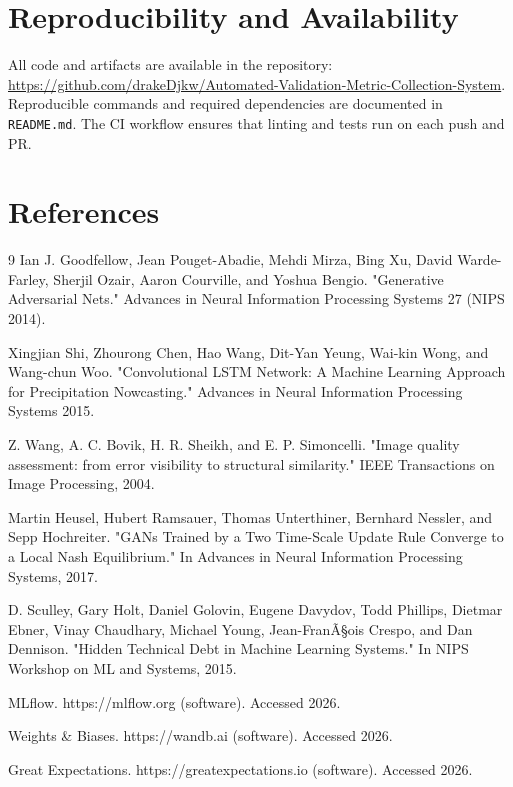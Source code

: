 \documentclass[11pt]{article}
\begin{document}
\section{Reproducibility and Availability}
All code and artifacts are available in the repository: \url{https://github.com/drakeDjkw/Automated-Validation-Metric-Collection-System}. Reproducible commands and required dependencies are documented in \texttt{README.md}. The CI workflow ensures that linting and tests run on each push and PR.

\section{References}
\begin{thebibliography}{9}
Ian J. Goodfellow, Jean Pouget-Abadie, Mehdi Mirza, Bing Xu, David Warde-Farley, Sherjil Ozair, Aaron Courville, and Yoshua Bengio. "Generative Adversarial Nets." Advances in Neural Information Processing Systems 27 (NIPS 2014).

Xingjian Shi, Zhourong Chen, Hao Wang, Dit-Yan Yeung, Wai-kin Wong, and Wang-chun Woo. "Convolutional LSTM Network: A Machine Learning Approach for Precipitation Nowcasting." Advances in Neural Information Processing Systems 2015.

Z. Wang, A. C. Bovik, H. R. Sheikh, and E. P. Simoncelli. "Image quality assessment: from error visibility to structural similarity." IEEE Transactions on Image Processing, 2004.

Martin Heusel, Hubert Ramsauer, Thomas Unterthiner, Bernhard Nessler, and Sepp Hochreiter. "GANs Trained by a Two Time-Scale Update Rule Converge to a Local Nash Equilibrium." In Advances in Neural Information Processing Systems, 2017.

D. Sculley, Gary Holt, Daniel Golovin, Eugene Davydov, Todd Phillips, Dietmar Ebner, Vinay Chaudhary, Michael Young, Jean-FranÃ§ois Crespo, and Dan Dennison. "Hidden Technical Debt in Machine Learning Systems." In NIPS Workshop on ML and Systems, 2015.

MLflow. https://mlflow.org (software). Accessed 2026.

Weights \& Biases. https://wandb.ai (software). Accessed 2026.

Great Expectations. https://greatexpectations.io (software). Accessed 2026.
\end{thebibliography}
\end{document}
